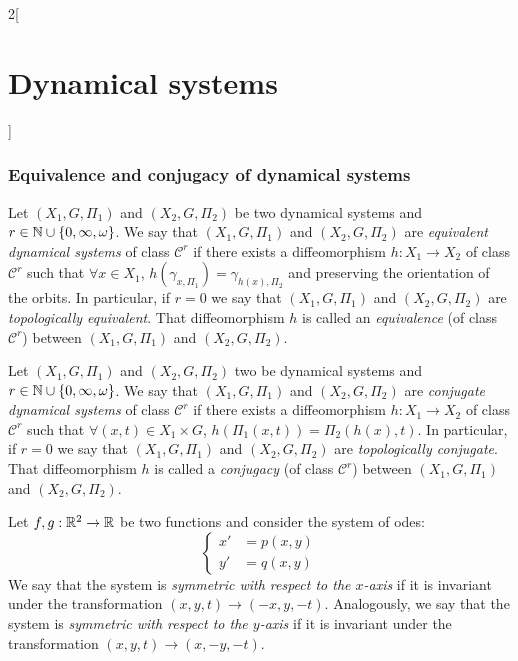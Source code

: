 \documentclass[../../../main.tex]{subfiles}
\begin{document}
\begin{multicols}{2}[\section{Dynamical systems}]
  \subsubsection{Equivalence and conjugacy of dynamical systems}
  \begin{definition}
    Let $(X_1,G,\Pi_1)$ and $(X_2,G,\Pi_2)$ be two dynamical systems and $r\in\mathbb{N}\cup\{0,\infty,\omega\}$. We say that $(X_1,G,\Pi_1)$ and $(X_2,G,\Pi_2)$ are \emph{equivalent dynamical systems} of class $\mathcal{C}^r$ if there exists a diffeomorphism $h:X_1\rightarrow X_2$ of class $\mathcal{C}^r$ such that $\forall x\in X_1$, $h(\gamma_{x,\Pi_1})=\gamma_{h(x),\Pi_2}$ and preserving the orientation of the orbits. In particular, if $r=0$ we say that $(X_1,G,\Pi_1)$ and $(X_2,G,\Pi_2)$ are \emph{topologically equivalent}. That diffeomorphism $h$ is called an \emph{equivalence} (of class $\mathcal{C}^r$) between $(X_1,G,\Pi_1)$ and $(X_2,G,\Pi_2)$.
  \end{definition}
  \begin{definition}
    Let $(X_1,G,\Pi_1)$ and $(X_2,G,\Pi_2)$ two be dynamical systems and $r\in\mathbb{N}\cup\{0,\infty,\omega\}$. We say that $(X_1,G,\Pi_1)$ and $(X_2,G,\Pi_2)$ are \emph{conjugate dynamical systems} of class $\mathcal{C}^r$ if there exists a diffeomorphism $h:X_1\rightarrow X_2$ of class $\mathcal{C}^r$ such that $\forall (x,t)\in X_1\times G$, $h(\Pi_1(x,t))=\Pi_2(h(x),t)$. In particular, if $r=0$ we say that $(X_1,G,\Pi_1)$ and $(X_2,G,\Pi_2)$ are \emph{topologically conjugate}. That diffeomorphism $h$ is called a \emph{conjugacy} (of class $\mathcal{C}^r$) between $(X_1,G,\Pi_1)$ and $(X_2,G,\Pi_2)$.
  \end{definition}
  \begin{definition}
    Let $f,g:\mathbb{R}^2\rightarrow\mathbb{R}$ be two functions and consider the system of odes:
    \begin{equation}\label{DS_plane}
      \left\{
      \begin{aligned}
        x' & =p(x,y) \\
        y' & =q(x,y)
      \end{aligned}
      \right.
    \end{equation}
    We say that the system is \emph{symmetric with respect to the $x$-axis} if it is invariant under the transformation $(x,y,t)\rightarrow(-x,y,-t)$. Analogously, we say that the system is \emph{symmetric with respect to the $y$-axis} if it is invariant under the transformation $(x,y,t)\rightarrow(x,-y,-t)$.
  \end{definition}

\end{multicols}
\end{document}
